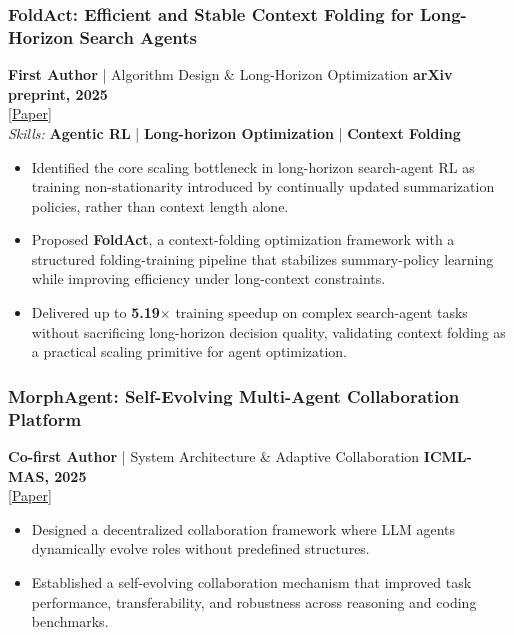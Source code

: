 \documentclass[10pt,a4paper]{article}
\begin{document}
    \subsubsection*{\color{itemcolor}FoldAct: Efficient and Stable Context Folding for Long-Horizon Search Agents}
    \noindent\textbf{\color{sectioncolor}First Author} | Algorithm Design \& Long-Horizon Optimization \hfill \color{accentcolor}\textbf{arXiv preprint, 2025} \\
    \noindent\href{https://arxiv.org/abs/2512.22733}{\color{linkcolor}[Paper]} \\
    \noindent\textit{\color{graytext}Skills:} \textbf{Agentic RL} | \textbf{Long-horizon Optimization} | \textbf{Context Folding}
    \begin{itemize}[leftmargin=*, label=\textcolor{accentcolor}{\textbullet}, itemsep=0.2em]
        \item Identified the core scaling bottleneck in long-horizon search-agent RL as training non-stationarity introduced by continually updated summarization policies, rather than context length alone.
        \item Proposed \textbf{FoldAct}, a context-folding optimization framework with a structured folding-training pipeline that stabilizes summary-policy learning while improving efficiency under long-context constraints.
        \item Delivered up to \textbf{5.19$\times$} training speedup on complex search-agent tasks without sacrificing long-horizon decision quality, validating context folding as a practical scaling primitive for agent optimization.
    \end{itemize}
    \vspace{0.3em}
    \subsubsection*{\color{itemcolor}MorphAgent: Self-Evolving Multi-Agent Collaboration Platform}
    \noindent\textbf{\color{sectioncolor}Co-first Author} | System Architecture \& Adaptive Collaboration \hfill \color{accentcolor}\textbf{ICML-MAS, 2025}
    \\
    \noindent\href{https://arxiv.org/abs/2410.15048}{\color{linkcolor}[Paper]} \\
    \begin{itemize}[leftmargin=*, label=\textcolor{accentcolor}{\textbullet}, itemsep=0.2em]
        \item Designed a decentralized collaboration framework where LLM agents dynamically evolve roles without predefined structures.
        \item Established a self-evolving collaboration mechanism that improved task performance, transferability, and robustness across reasoning and coding benchmarks.
    \end{itemize}
\end{document}
